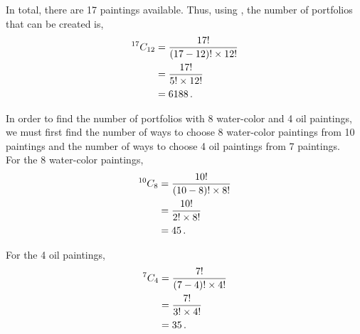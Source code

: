 %
%


\begin{subquestions}
	
\subquestion
		
\begin{subsubquestions}
	
\subsubquestion

In total, there are 17 paintings available. Thus, using , the number of portfolios that can be created is,
\begin{align}
	^{17}C_{12} & = \frac{17!}{(17-12)! \times 12!} \nonumber \\
	            & = \frac{17!}{5! \times 12!} \nonumber \\
	            & = 6188 \,.
\end{align}
	
	
\subsubquestion 

In order to find the number of portfolios with 8 water-color and 4 oil paintings, we must first find the number of ways to choose 8 water-color paintings from 10 paintings and the number of ways to choose 4 oil paintings from 7 paintings. \\

For the 8 water-color paintings,
\begin{align}
	^{10}C_{8} & = \frac{10!}{(10-8)! \times 8!} \nonumber \\
	           & = \frac{10!}{2! \times 8!} \nonumber \\
	           & = 45 \,.
\end{align}

For the 4 oil paintings,
\begin{align}
	^{7}C_{4} & = \frac{7!}{(7-4)! \times 4!} \nonumber \\
	          & = \frac{7!}{3! \times 4!} \nonumber \\
	          & = 35 \,.
\end{align}


\end{subsubquestions}
\end{subquestions}
